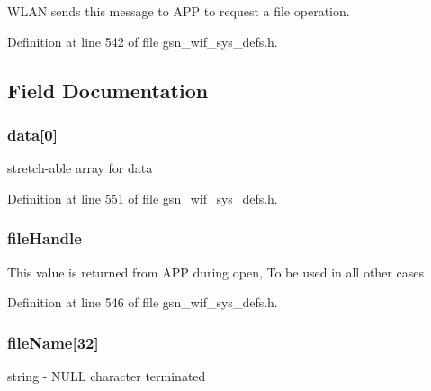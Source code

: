 WLAN sends this message to APP to request a file operation. 

Definition at line 542 of file gsn\_\-wif\_\-sys\_\-defs.h.



\subsection{Field Documentation}
\hypertarget{a00350_a29500e452cff835f2b70d1dff36f918a}{
\subsubsection[{data}]{ {\bf data}\mbox{[}0\mbox{]}}}
\label{a00350_a29500e452cff835f2b70d1dff36f918a}
stretch-\/able array for data 

Definition at line 551 of file gsn\_\-wif\_\-sys\_\-defs.h.

\hypertarget{a00350_a31636a2d20d4a83f03ddba7c789cb00a}{
\subsubsection[{fileHandle}]{ {\bf fileHandle}}}
\label{a00350_a31636a2d20d4a83f03ddba7c789cb00a}
This value is returned from APP during open, To be used in all other cases 

Definition at line 546 of file gsn\_\-wif\_\-sys\_\-defs.h.

\hypertarget{a00350_a44211bff423210b4e239a8616f8bbd33}{
\subsubsection[{fileName}]{ {\bf fileName}\mbox{[}32\mbox{]}}}
\label{a00350_a44211bff423210b4e239a8616f8bbd33}
string -\/ NULL character terminated 

